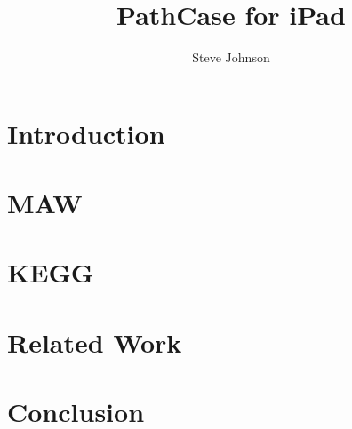 \documentclass[12pt]{report}
\title{PathCase for iPad}
\author{Steve Johnson}
\begin{document}


\setcounter{page}{1}


\tableofcontents


\listoffigures

\doublespace

\pagebreak

\setcounter{page}{1}


\pagebreak

\chapter{Introduction}
\label{ch:introduction}


\chapter{MAW}
\label{ch:maw_smda}


\chapter{KEGG}
\label{ch:kegg}


\chapter{Related Work}
\label{ch:related_work}


\chapter{Conclusion}
\label{ch:conclusion}


\nocite{*}


\end{document}
